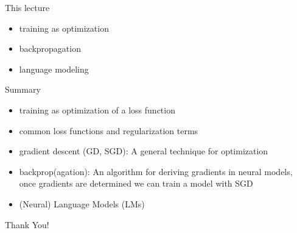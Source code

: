 \begin{frame}
\titlepage
\end{frame}
\begin{frame}{This lecture}
\vspace*{1cm}
\begin{itemize}
\item training as optimization
\item backpropagation
\item language modeling
\end{itemize}
\end{frame}



\begin{frame}{Summary}
    \begin{itemize}
        \item training as optimization of a loss function
        \item common loss functions and regularization terms
        \item gradient descent (GD, SGD): A general technique for optimization
        \item backprop(agation): An algorithm for deriving gradients in neural models, once  gradients are determined we can train a model with SGD
        \item (Neural) Language Models (LMs) 
    \end{itemize}
\end{frame}
\begin{frame}[c]
\begin{center}
\LARGE{Thank You!}
\end{center}
\end{frame}

